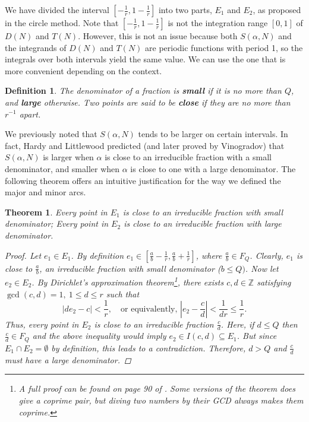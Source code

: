 \documentclass{article}
\newtheorem{theorem}{Theorem}
\newtheorem{definition}{Definition}
\begin{document}
We have divided the interval $\left[-\frac{1}{r}, 1 -\frac{1}{r}\right]$ into two parts, $E_1$ and $E_2$, as proposed in the circle method. Note that $\left[-\frac{1}{r}, 1 -\frac{1}{r}\right]$ is not the integration range $[0,1]$ of $D(N)$ and $T(N)$. However, this is not an issue because both $S(\alpha, N)$ and the integrands of $D(N)$ and $T(N)$ are periodic functions with period 1, so the integrals over both intervals yield the same value. We can use the one that is more convenient depending on the context.
\begin{definition}
    The denominator of a fraction is \textbf{small} if it is no more than $Q$, and \textbf{large} otherwise. Two points are said to be \textbf{close} if they are no more than $r^{-1}$ apart.
\end{definition}

We previously noted that $S(\alpha, N)$ tends to be larger on certain intervals. In fact, Hardy and Littlewood predicted (and later proved by Vinogradov) that $S(\alpha, N)$ is larger when $\alpha$ is close to an irreducible fraction with a small denominator, and smaller when $\alpha$ is close to one with a large denominator. The following theorem offers an intuitive justification for the way we defined the major and minor arcs.
\begin{theorem}\label{e1}
    Every point in $E_1$ is close to an irreducible fraction with small denominator; Every point in $E_2$ is close to an irreducible fraction with large denominator.
    \begin{proof}
        Let $e_1 \in E_1$. By definition $e_1 \in \left[\frac{a}{b} - \frac{1}{r}, \frac{a}{b} + \frac{1}{r}\right]$, where $\displaystyle\frac{a}{b} \in F_Q$. Clearly, $e_1$ is close to $\frac{a}{b}$, an irreducible fraction with small denominator ($b \leq Q)$. Now let $e_2 \in E_2$. By Dirichlet's approximation theorem\footnote{A full proof can be found on page 90 of \cite{pan}. Some versions of the theorem does give a coprime pair, but diving two numbers by their GCD always makes them coprime.},  there exists $c, d \in \mathbb{Z}$ satisfying $\gcd(c,d) = 1, \ 1 \leq d \leq r$ such that 
        \begin{equation*}
            \left|de_2 - c\right| < \frac{1}{r}, \quad \text{or equivalently, } \left|e_2 - \frac{c}{d} \right| < \frac{1}{dr} \leq \frac{1}{r}.
        \end{equation*}
        Thus, every point in $E_2$ is close to an irreducible fraction $\displaystyle\frac{c}{d}$. Here, if $d \leq Q$ then $\displaystyle\frac{c}{d} \in F_Q$ and the above inequality would imply $e_2 \in I(c,d) \subseteq E_1$. But since $E_1 \cap E_2 = \emptyset$ by definition, this leads to a contradiction. Therefore, $d > Q$ and $\displaystyle\frac{c}{d}$ must have a large denominator.
    \end{proof}
\end{theorem}
\end{document}
